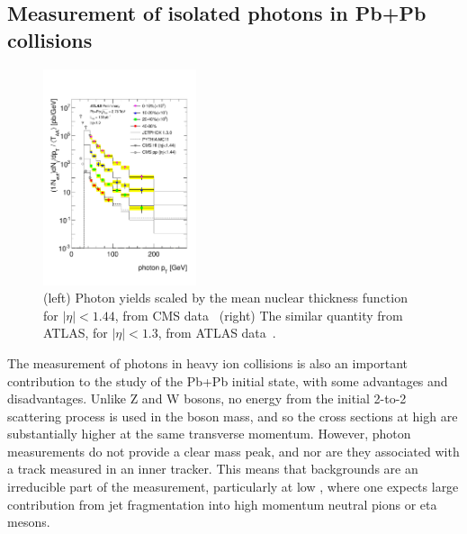 \subsection{Measurement of isolated photons in Pb+Pb collisions}

\begin{figure}[!htb]
\begin{center}
\includegraphics[width=0.40\textwidth]{electroweak_figs/ph_fig_11.pdf}
\caption[]{(left) Photon yields scaled by the mean nuclear thickness function for $|\eta|<1.44$, from CMS data~\cite{Chatrchyan:2012vq} (right) The similar quantity from ATLAS, for $|\eta|<1.3$, from ATLAS data~\cite{ATLAS:2012zla}.}
\label{fig:pas:photon}
\end{center}
\end{figure}

The measurement of photons in heavy ion collisions is also an important contribution to the
study of the Pb+Pb initial state, with some advantages and disadvantages.  Unlike Z and W bosons, 
no energy from the initial 2-to-2 scattering process is used in the boson mass, 
and so the cross sections at high \pT are substantially higher at the same transverse momentum.
However, photon measurements do not provide a clear mass peak, and nor are they associated with
a track measured in an inner tracker.  This means that backgrounds are an irreducible part of
the measurement, particularly at low \pT, where one expects large contribution from jet fragmentation
into high momentum neutral pions or eta mesons.


